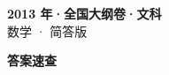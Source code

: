 \documentclass[zihao=-4, a4paper]{ctexart}
\begin{document}
\begin{center}
  {\Large\bfseries 2013 年·全国大纲卷·文科}\\[4pt]
  {\large 数学 · 简答版}
\end{center}
\medskip
{}

\clearpage
{}
\begin{center}{\Large\bfseries 答案速查}\end{center}
\medskip

\end{document}
